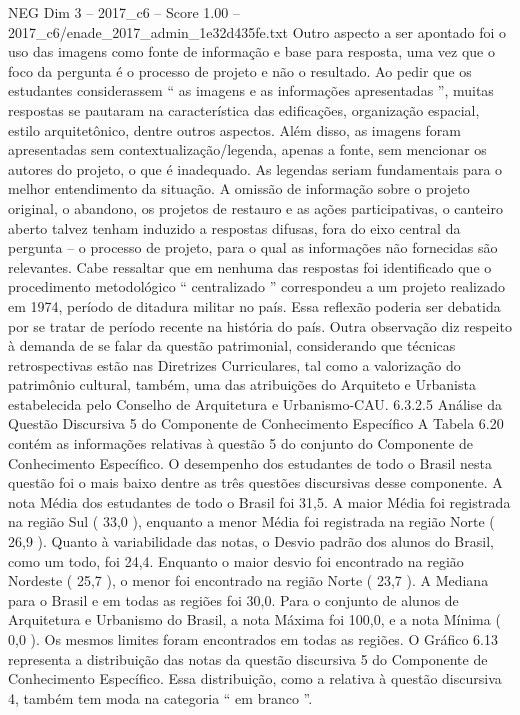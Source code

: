 \begin{textsample}{NEG Dim 3 – 2017\_c6 – Score 1.00 – 2017\_c6/enade\_2017\_admin\_1e32d435fe.txt}
Outro aspecto a ser apontado foi o uso das imagens como fonte de informação e base para resposta, uma vez que o foco da pergunta é o processo de projeto e não o resultado.
Ao pedir que os estudantes considerassem “ as imagens e as informações apresentadas ”, muitas respostas se pautaram na característica das edificações, organização espacial, estilo arquitetônico, dentre outros aspectos.
Além disso, as imagens foram apresentadas sem contextualização/legenda, apenas a fonte, sem mencionar os autores do projeto, o que é inadequado.
As legendas seriam fundamentais para o melhor entendimento da situação.
A omissão de informação sobre o projeto original, o abandono, os projetos de restauro e as ações participativas, o canteiro aberto talvez tenham induzido a respostas difusas, fora do eixo central da pergunta – o processo de projeto, para o qual as informações não fornecidas são relevantes.
Cabe ressaltar que em nenhuma das respostas foi identificado que o procedimento metodológico “ centralizado ” correspondeu a um projeto realizado em 1974, período de ditadura militar no país.
Essa reflexão poderia ser debatida por se tratar de período recente na história do país.
Outra observação diz respeito à demanda de se falar da questão patrimonial, considerando que técnicas retrospectivas estão nas Diretrizes Curriculares, tal como a valorização do patrimônio cultural, também, uma das atribuições do Arquiteto e Urbanista estabelecida pelo Conselho de Arquitetura e Urbanismo-CAU. 6.3.2.5 Análise da Questão Discursiva 5 do Componente de Conhecimento Específico A Tabela 6.20 contém as informações relativas à questão 5 do conjunto do Componente de Conhecimento Específico.
O desempenho dos estudantes de todo o Brasil nesta questão foi o mais baixo dentre as três questões discursivas desse componente.
A nota Média dos estudantes de todo o Brasil foi 31,5.
A maior Média foi registrada na região Sul ( 33,0 ), enquanto a menor Média foi registrada na região Norte ( 26,9 ).
Quanto à variabilidade das notas, o Desvio padrão dos alunos do Brasil, como um todo, foi 24,4.
Enquanto o maior desvio foi encontrado na região Nordeste ( 25,7 ), o menor foi encontrado na região Norte ( 23,7 ).
A Mediana para o Brasil e em todas as regiões foi 30,0.
Para o conjunto de alunos de Arquitetura e Urbanismo do Brasil, a nota Máxima foi 100,0, e a nota Mínima ( 0,0 ).
Os mesmos limites foram encontrados em todas as regiões.
O Gráfico 6.13 representa a distribuição das notas da questão discursiva 5 do Componente de Conhecimento Específico.
Essa distribuição, como a relativa à questão discursiva 4, também tem moda na categoria “ em branco ”.

\end{textsample}
